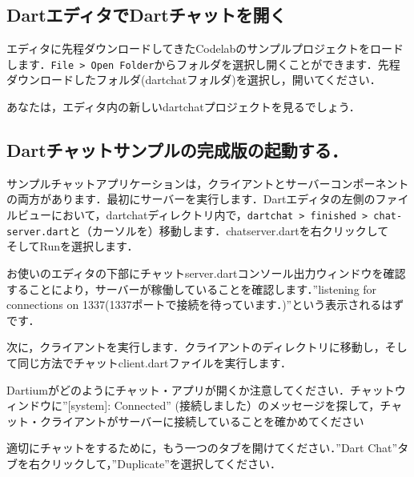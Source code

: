 
\subsection{DartエディタでDartチャットを開く}

エディタに先程ダウンロードしてきたCodelabのサンプルプロジェクトをロードします．\verb|File > Open Folder|からフォルダを選択し開くことができます．先程ダウンロードしたフォルダ(dartchatフォルダ)を選択し，開いてください．


あなたは，エディタ内の新しいdartchatプロジェクトを見るでしょう．


\subsection{Dartチャットサンプルの完成版の起動する．}

サンプルチャットアプリケーションは，クライアントとサーバーコンポーネントの両方があります．最初にサーバーを実行します．Dartエディタの左側のファイルビューにおいて，dartchatディレクトリ内で，\verb|dartchat > finished > chat-server.dart|と（カーソルを）移動します．chatserver.dartを右クリックして　そしてRunを選択します．


お使いのエディタの下部にチャットserver.dartコンソール出力ウィンドウを確認することにより，サーバーが稼働していることを確認します．''listening for connections on 1337(1337ポートで接続を待っています．)''という表示されるはずです．


次に，クライアントを実行します．クライアントのディレクトリに移動し，そして同じ方法でチャットclient.dartファイルを実行します．


Dartiumがどのようにチャット・アプリが開くか注意してください．チャットウィンドウに''[system]: Connected'' (接続しました）のメッセージを探して，チャット・クライアントがサーバーに接続していることを確かめてください


適切にチャットをするために，もう一つのタブを開けてください．''Dart Chat''タブを右クリックして，''Duplicate''を選択してください．


